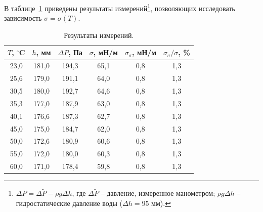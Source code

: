 \documentclass[a4paper,12pt]{article} %
\begin{document}
	В таблице~\ref{table:main} приведены результаты измерений\footnote{$\Delta P = \Delta \tilde{P} - \rho g \Delta h$, где $\Delta \tilde{P}$ -- давление, измеренное манометром; $\rho g \Delta h$ -- гидростатические давление воды ($\Delta h = 95$ мм).}, позволяющих исследовать зависимость $\sigma = \sigma (T)$.
\begin{table}[H]
	\caption{Результаты измерений.}
	\label{table:main}
\begin{tabular}{|c|c|c|c|c|c|}
	\hline
	$T$, $^\circ$C & $h$, мм & $\Delta P$, Па & $\sigma$, мН/м & $\sigma_\sigma$, мН/м & $\sigma_\sigma / \sigma$, \% \\ \hline
	23,0           & 181,0   & 194,3          & 65,1           & 0,8                   & 1,3                          \\ \hline
	25,6           & 179,0   & 191,1          & 64,0           & 0,8                   & 1,3                          \\ \hline
	30,5           & 180,0   & 192,7          & 64,6           & 0,8                   & 1,3                          \\ \hline
	35,3           & 177,0   & 187,9          & 63,0           & 0,8                   & 1,3                          \\ \hline
	40,1           & 176,6   & 187,3          & 62,7           & 0,8                   & 1,3                          \\ \hline
	45,0           & 175,0   & 184,7          & 62,0           & 0,8                   & 1,3                          \\ \hline
	50,0           & 172,6   & 180,9          & 60,6           & 0,8                   & 1,3                          \\ \hline
	55,0           & 172,0   & 180,0          & 60,3           & 0,8                   & 1,3                          \\ \hline
	60,0           & 171,0   & 178,4          & 59,8           & 0,8                   & 1,3                          \\ \hline
\end{tabular}
\end{table}
\end{document}
